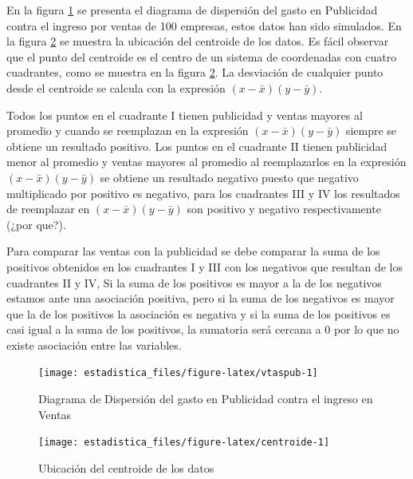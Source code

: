 \documentclass[]{book}
\begin{document}
En la figura \ref{fig:vtaspub} se presenta el diagrama de dispersión del gasto en Publicidad contra el ingreso por ventas de 100 empresas, estos datos han sido simulados. En la figura \ref{fig:centroide} se muestra la ubicación del centroide de los datos. Es fácil observar que el punto del centroide es el centro de un sistema de coordenadas con cuatro cuadrantes, como se muestra en la figura \ref{fig:centroide}. La desviación de cualquier punto desde el centroide se calcula con la expresión \(\left(x-\bar{x}\right)\left(y-\bar{y}\right)\).

Todos los puntos en el cuadrante I tienen publicidad y ventas mayores al promedio y cuando se reemplazan en la expresión \(\left(x-\bar{x}\right)\left(y-\bar{y}\right)\) siempre se obtiene un resultado positivo. Los puntos en el cuadrante II tienen publicidad menor al promedio y ventas mayores al promedio al reemplazarlos en la expresión \(\left(x-\bar{x}\right)\left(y-\bar{y}\right)\) se obtiene un resultado negativo puesto que negativo multiplicado por positivo es negativo, para los cuadrantes III y IV los resultados de reemplazar en \(\left(x-\bar{x}\right)\left(y-\bar{y}\right)\) son positivo y negativo respectivamente (¿por que?).

Para comparar las ventas con la publicidad se debe comparar la suma de los positivos obtenidos en los cuadrantes I y III con los negativos que resultan de los cuadrantes II y IV, Si la suma de los positivos es mayor a la de los negativos estamos ante una asociación positiva, pero si la suma de los negativos es mayor que la de los positivos la asociación es negativa y si la suma de los positivos es casi igual a la suma de los positivos, la sumatoria será cercana a \(0\) por lo que no existe asociación entre las variables.

\begin{figure}[h]

{\centering \texttt{[image: estadistica\_files/figure-latex/vtaspub-1]} 

}

\caption{Diagrama de Dispersión del gasto en Publicidad contra el ingreso en Ventas}\label{fig:vtaspub}
\end{figure}

\begin{figure}[h]

{\centering \texttt{[image: estadistica\_files/figure-latex/centroide-1]} 

}

\caption{Ubicación del centroide de los datos}\label{fig:centroide}
\end{figure}
\end{document}

